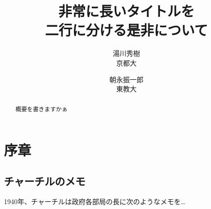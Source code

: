 \documentclass{jlreq}
\begin{document}
\title{非常に長いタイトルを \\ 二行に分ける是非について}
\author{湯川秀樹\\ 京都大 \and 朝永振一郎 \\ 東教大} 
\maketitle
\begin{abstract}
    概要を書きますかぁ
\end{abstract}

\section{序章}
\subsection{チャーチルのメモ}
 1940年、チャーチルは政府各部局の長に次のようなメモを…
\end{document}
